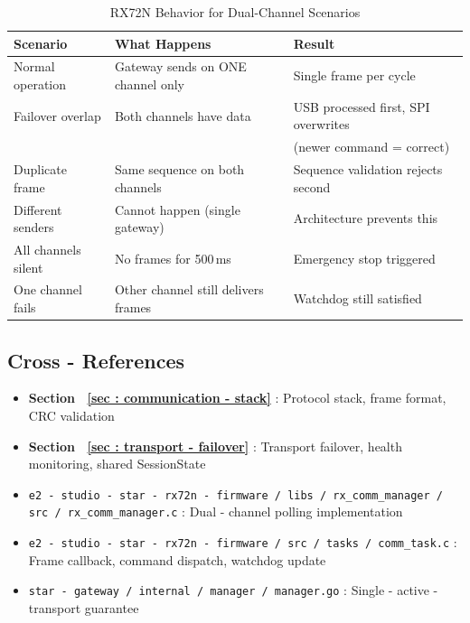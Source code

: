 \begin{table}[H]
\centering
\caption {RX72N Behavior for Dual-Channel Scenarios
}
\label {
tab:
  dual - channel - matrix
}
\begin{tabular} { l l l}
\toprule
\textbf{Scenario} & \textbf{What Happens} & \textbf{Result} \\
\midrule
Normal operation    & Gateway sends on ONE channel only          & Single frame per cycle \\
Failover overlap    & Both channels have data                   & USB processed first, SPI overwrites \\
                    &                                           & (newer command = correct) \\
Duplicate frame     & Same sequence on both channels             & Sequence validation rejects second \\
Different senders   & Cannot happen (single gateway)            & Architecture prevents this \\
All channels silent & No frames for 500\,ms                     & Emergency stop triggered \\
One channel fails   & Other channel still delivers frames       & Watchdog still satisfied \\
\bottomrule
\end{tabular}
\end{table}

\subsection{Cross - References}

\begin{itemize}[leftmargin = 1.5em, topsep = 4pt, itemsep = 2pt]
    \item \textbf{Section ~\ref{sec : communication - stack}} : Protocol stack,
                                                                 frame format,
                                                                 CRC validation
    \item \textbf{Section ~\ref{sec : transport - failover}}
    : Transport failover,
      health monitoring,
      shared SessionState
    \item \texttt{e2 - studio - star - rx72n -
                   firmware / libs / rx\_comm\_manager / src /
                       rx\_comm\_manager.c}
    : Dual -
      channel polling implementation
    \item \texttt{e2 - studio - star - rx72n -
                   firmware / src / tasks / comm\_task.c} : Frame callback,
      command dispatch,
      watchdog update
    \item \texttt{star - gateway / internal / manager / manager.go}
    : Single -
      active - transport guarantee
\end{itemize}
